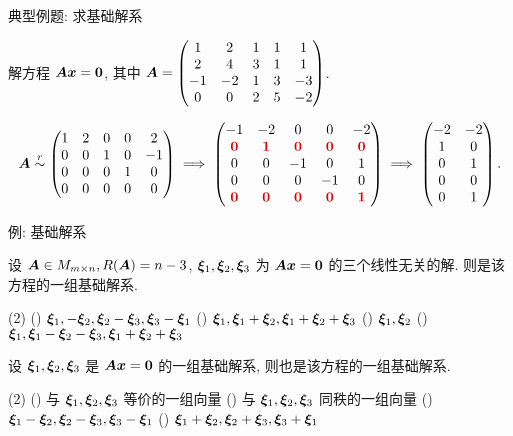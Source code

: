 \begin{frame}{典型例题: 求基础解系}
	\onslide<+->
	\begin{exercise}
		解方程 $\bfA\bfx={\bf0}$, 其中 $\bfA=\begin{pmatrix}
			1&2&1&1&1\\
			2&4&3&1&1\\
			-1&-2&1&3&-3\\
			0&0&2&5&-2
		\end{pmatrix}$.
	\end{exercise}
	\onslide<+->
	\begin{answer}
		\[\bfA\simr\begin{pmatrix}
			1&2&0&0&2\\
			0&0&1&0&-1\\
			0&0&0&1&0\\
			0&0&0&0&0
		\end{pmatrix}\implies\begin{pmatrix}
			-1&-2&0&0&-2\\
			\alert0&\alert1&\alert0&\alert0&\alert0\\
			0&0&-1&0&1\\
			0&0&0&-1&0\\
			\alert0&\alert0&\alert0&\alert0&\alert1
		\end{pmatrix}\implies\begin{pmatrix}
			-2&-2\\
			1&0\\
			0&1\\
			0&0\\
			0&1
		\end{pmatrix}.\]
	\end{answer}
\end{frame}


\begin{frame}{例: 基础解系}
	\onslide<+->
	\begin{example}
		设 $\bfA\in M_{m\times n}, R(\bfA)=n-3$, $\bmx_1,\bmx_2,\bmx_3$ 为 $\bfA\bfx={\bf0}$ 的三个线性无关的解.
		则是该方程的一组基础解系.
		\begin{taskschoice}(2)
			() $\bmx_1,-\bmx_2,\bmx_2-\bmx_3,\bmx_3-\bmx_1$
			() $\bmx_1,\bmx_1+\bmx_2,\bmx_1+\bmx_2+\bmx_3$
			() $\bmx_1,\bmx_2$
			() $\bmx_1,\bmx_1-\bmx_2-\bmx_3,\bmx_1+\bmx_2+\bmx_3$
		\end{taskschoice}
	\end{example}
	\onslide<+->
	\begin{exercise}
		设 $\bmx_1,\bmx_2,\bmx_3$ 是 $\bfA\bfx={\bf0}$ 的一组基础解系, 则也是该方程的一组基础解系.
		\begin{taskschoice}(2)
			() 与 $\bmx_1,\bmx_2,\bmx_3$ 等价的一组向量
			() 与 $\bmx_1,\bmx_2,\bmx_3$ 同秩的一组向量
			() $\bmx_1-\bmx_2,\bmx_2-\bmx_3,\bmx_3-\bmx_1$
			() $\bmx_1+\bmx_2,\bmx_2+\bmx_3,\bmx_3+\bmx_1$
		\end{taskschoice}
	\end{exercise}
\end{frame}


